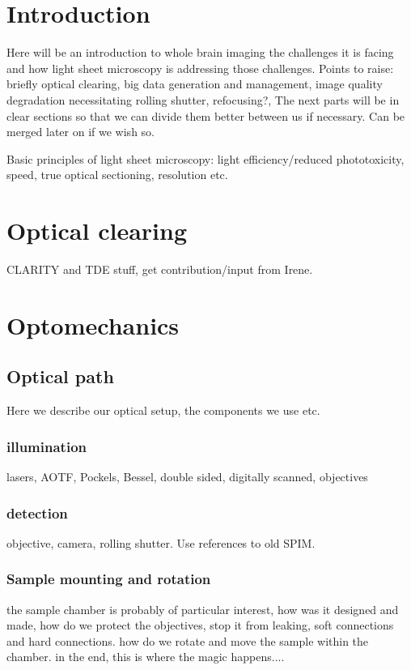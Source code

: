 \documentclass[12pt]{spieman}  %
\begin{document}
\begin{spacing}{2}   %

\section{Introduction}
\label{sect:intro}  %
Here will be an introduction to whole brain imaging the challenges it is facing and how light sheet microscopy is addressing those challenges. Points to raise: briefly optical clearing, big data generation and management, image quality degradation necessitating rolling shutter, refocusing?, The next parts will be in clear sections so that we can divide them better between us if necessary. Can be merged later on if we wish so.

Basic principles of light sheet microscopy: light efficiency/reduced phototoxicity, speed, true optical sectioning, resolution etc.

\section{Optical clearing}
CLARITY and TDE stuff, get contribution/input from Irene.

\section{Optomechanics}
	\subsection{Optical path}
Here we describe our optical setup, the components we use etc. 
		\subsubsection{illumination}
		lasers, AOTF, Pockels, Bessel, double sided, digitally scanned, objectives
		\subsubsection{detection}
		objective, camera, rolling shutter. Use references\cite{Silvestri2012} to old SPIM.
		\subsubsection{Sample mounting and rotation}
		the sample chamber is probably of particular interest, how was it designed and made, how do we protect the objectives, stop it from leaking, soft connections and hard connections. how do we rotate and move the sample within the chamber. in the end, this is where the magic happens....


\end{spacing}
\end{document}
